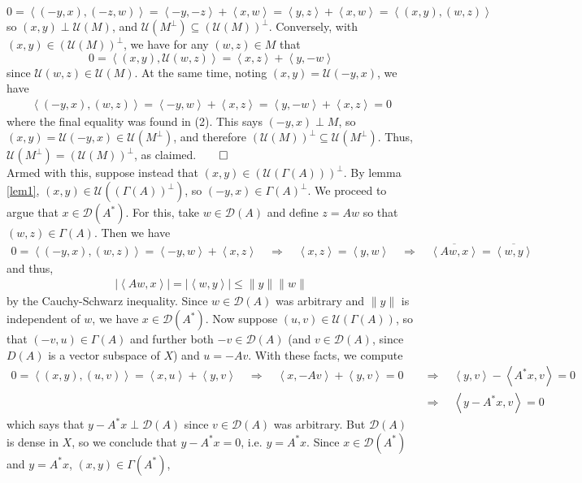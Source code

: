 \documentclass[10pt]{article}
\newcommand{\1}[1]{\mathbbm{1}_{#1}} \newcommand{\mc}[1]{\mathcal{#1}}
\newcommand{\ip}[2]{\left\langle#1,#2\right\rangle }
\begin{document}
    \[0=\ip{(-y,x)}{(-z,w)}=\ip{-y}{-z}+\ip{x}{w}=\ip{y}{z}+\ip{x}{w}=\ip{(x,y)}{(w,z)}\]
    so $(x,y)\perp\mc{U}(M)$, and $\mc{U}(M^\perp)\subseteq(\mc{U}(M))^\perp$. Conversely, with $(x,y)\in(\mc{U}(M))^\perp$,
    we have for any $(w,z)\in M$ that
    \[0=\ip{(x,y)}{\mc{U}(w,z)}=\ip{x}{z}+\ip{y}{-w}\tag{2}\]
    since $\mc{U}(w,z)\in\mc{U}(M)$. At the same time, noting $(x,y)=\mc{U}(-y,x)$, we have
    \begin{align*}
        \ip{(-y,x)}{(w,z)}=\ip{-y}{w}+\ip{x}{z}=\ip{y}{-w}+\ip{x}{z}=0
    \end{align*}
    where the final equality was found in (2). This says $(-y,x)\perp M$, so $(x,y)=\mc{U}(-y,x)\in\mc{U}(M^\perp)$, and therefore $(\mc{U}(M))^\perp\subseteq\mc{U}(M^\perp)$.
    Thus, $\mc{U}(M^\perp)=(\mc{U}(M))^\perp$, as claimed.\hfill{$\qed$}\\[5pt]
    Armed with this, suppose instead that $(x,y)\in(\mc{U}(\Gamma(A)))^\perp$. By lemma \ref{lem1}, $(x,y)\in\mc{U}((\Gamma(A))^\perp)$, so $(-y,x)\in\Gamma(A)^\perp$. We proceed to argue that $x\in\mc{D}(A^\ast)$.
    For this, take $w\in\mc{D}(A)$ and define $z=Aw$
    so that $(w,z)\in\Gamma(A)$. Then we have
    \begin{align*}
        0=\ip{(-y,x)}{(w,z)}=\ip{-y}{w}+\ip{x}{z}\quad\Rightarrow\quad\ip{x}{z}=\ip{y}{w}\quad\Rightarrow\quad \overline{\ip{Aw}{x}}=\overline{\ip{w}{y}}
    \end{align*}
    and thus,
    \begin{align*}
        |\ip{Aw}{x}|=|\ip{w}{y}|\leq\|y\|\|w\|
    \end{align*}
    by the Cauchy-Schwarz inequality. Since $w\in\mc{D}(A)$ was arbitrary and $\|y\|$ is independent of $w$, we have $x\in\mc{D}(A^\ast)$.
    Now suppose $(u,v)\in \mc{U}(\Gamma(A))$, so that $(-v,u)\in\Gamma(A)$ and further both $-v\in\mc{D}(A)$ (and $v\in\mc{D}(A)$, since $D(A)$ is a vector subspace of $X$) and $u=-Av$.
    With these facts, we compute
    \begin{align*}
        0=\ip{(x,y)}{(u,v)}=\ip{x}{u}+\ip{y}{v}\quad\Rightarrow\quad \ip{x}{-Av}+\ip{y}{v}=0\quad&\Rightarrow\quad \ip{y}{v}-\ip{A^\ast x}{v}=0\tag{3}\\
        &\Rightarrow\quad \ip{y-A^\ast x}{v}=0
    \end{align*}
    which says that $y-A^\ast x\perp\mc{D}(A)$ since $v\in\mc{D}(A)$ was arbitrary. But $\mc{D}(A)$ is dense in $X$, so we conclude that $y-A^\ast x=0$, i.e. $y=A^\ast x$. Since $x\in\mc{D}(A^\ast)$ and $y=A^\ast x$, $(x,y)\in\Gamma(A^\ast)$,
\end{document}
